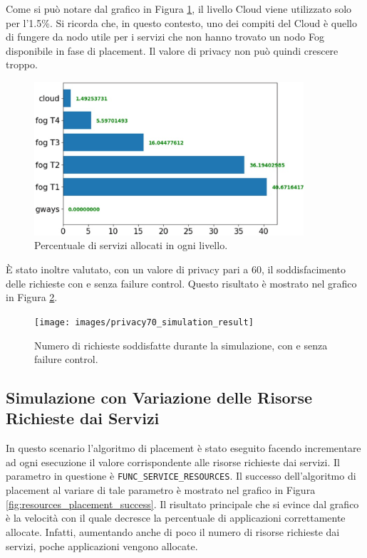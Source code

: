 Come si può notare dal grafico in Figura \ref{fig:privacy_placement_per_level}, il livello Cloud viene utilizzato solo per l'1.5\%. Si ricorda che, in questo contesto, uno dei compiti del Cloud è quello di fungere da nodo utile per i servizi che non hanno trovato un nodo Fog disponibile in fase di placement. Il valore di privacy non può quindi crescere troppo.

\begin{figure}[!ht]
  \includegraphics[width=10cm]{images/privacy_placement_per_level}
  \centering
  \caption{Percentuale di servizi allocati in ogni livello.}
  \label{fig:privacy_placement_per_level}
\end{figure}

È stato inoltre valutato, con un valore di privacy pari a 60, il soddisfacimento delle richieste con e senza failure control. Questo risultato è mostrato nel grafico in Figura \ref{fig:privacy70_simulation_result}.

\begin{figure}[!ht]
  \texttt{[image: images/privacy70\_simulation\_result]}
  \centering
  \caption{Numero di richieste soddisfatte durante la simulazione, con e senza failure control.}
  \label{fig:privacy70_simulation_result}
\end{figure}

\subsection{Simulazione con Variazione delle Risorse Richieste dai Servizi}

In questo scenario l'algoritmo di placement è stato eseguito facendo incrementare ad ogni esecuzione il valore corrispondente alle risorse richieste dai servizi. Il parametro in questione è \texttt{FUNC\_SERVICE\_RESOURCES}. Il successo dell'algoritmo di placement al variare di tale parametro è mostrato nel grafico in Figura \ref{fig:resources_placement_success}. Il risultato principale che si evince dal grafico è la velocità con il quale decresce la percentuale di applicazioni correttamente allocate. Infatti, aumentando anche di poco il numero di risorse richieste dai servizi, poche applicazioni vengono allocate.

